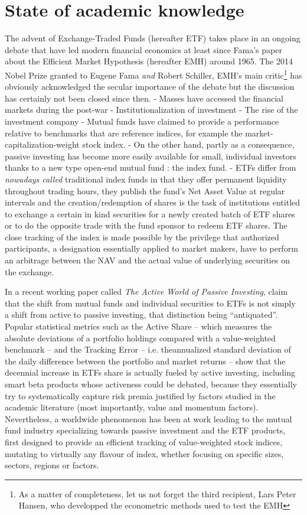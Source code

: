 \section{State of academic knowledge}
The advent of Exchange-Traded Funds (hereafter ETF) takes place in an ongoing debate that have led modern financial economics at least since Fama's paper about the Efficient Market Hypothesis (hereafter EMH) around 1965. The 2014 Nobel Prize granted to Eugene Fama \textit{and} Robert Schiller, EMH's main critic\footnote{As a matter of completeness, let us not forget the third recipient, Lars Peter Hansen, who developped the econometric methods used to test the EMH} has obviously acknowledged the secular importance of the debate but the discussion has certainly not been closed since then.
- Masses have accessed the financial markets during the post-war
- Institutionalization of investment
- The rise of the investment company
- Mutual funds have claimed to provide a performance relative to benchmarks that are reference indices, for example the market-capitalization-weight stock index.
- On the other hand, partly as a consequence, passive investing has become more easily available for small, individual investors thanks to a new type open-end mutual fund : the index fund.
- ETFs differ from \textit{nowadays called} traditional index funds in that they offer permanent liquidity throughout trading hours, they publish the fund's Net Asset Value at regular intervals and the creation/redemption of shares is the task of institutions entitled to exchange a certain in kind securities for a newly created batch of ETF shares or to do the opposite trade with the fund sponsor to redeem ETF shares. The close tracking of the index is made possible by the privilege that authorized participants, a designation essentially applied to market makers, have to perform an arbitrage between the NAV and the actual value of underlying securities on the exchange. 

\parencite{Ben-David2011}
In a recent working paper called \textit{The Active World of Passive Investing}, \cite{Easley2018} claim that the shift from mutual funds and individual securities to ETFs is not simply a shift from active to passive investing, that distinction being ``antiquated''. Popular statistical metrics such as the Active Share -- which measures the absolute deviations of a portfolio holdings compared with a value-weighted benchmark -- and the Tracking Error -- i.e. theannualized standard deviation of the daily difference between the portfolio and market returns -- show that the decennial increase in ETFs share is actually fueled by active investing, including smart beta products whose activeness could be debated, because they essentially try to systematically capture risk premia justified by factors studied in the academic literature (most importantly, value and momentum factors). Nevertheless, a worldwide phenomenon has been at work leading to the mutual fund industry specializing towards passive investment and the ETF products, first designed to provide an efficient tracking of value-weighted stock indices, mutating to virtually any flavour of index, whether focusing on specific sizes, sectors, regions or factors.  
